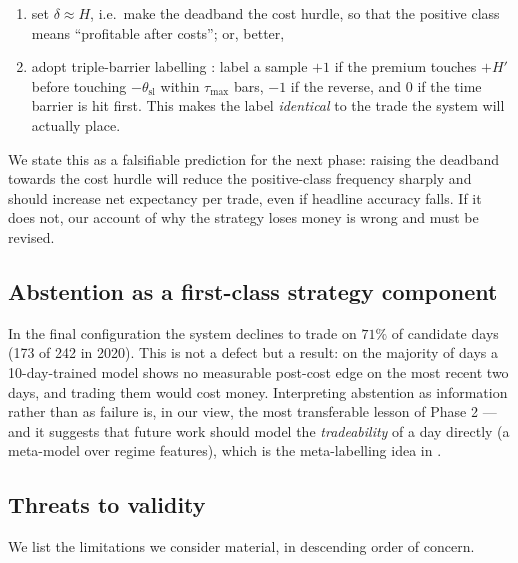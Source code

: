 \documentclass[11pt,a4paper]{article}
\begin{document}
\begin{enumerate}
  \item set $\delta \approx H$, i.e.\ make the deadband the cost hurdle, so that the
        positive class means ``profitable after costs''; or, better,
  \item adopt triple-barrier labelling \cite{lopezdeprado,darufinance}: label a sample
        $+1$ if the premium touches $+H'$ before touching $-\theta_{\text{sl}}$ within
        $\tau_{\max}$ bars, $-1$ if the reverse, and $0$ if the time barrier is hit first.
        This makes the label \emph{identical} to the trade the system will actually place.
\end{enumerate}
We state this as a falsifiable prediction for the next phase: raising the deadband
towards the cost hurdle will reduce the positive-class frequency sharply and should
increase net expectancy per trade, even if headline accuracy falls. If it does not, our
account of why the strategy loses money is wrong and must be revised.

\subsection{Abstention as a first-class strategy component}

In the final configuration the system declines to trade on $71\%$ of candidate days
(173 of 242 in 2020). This is not a defect but a result: on the majority of days a
10-day-trained model shows no measurable post-cost edge on the most recent two days, and
trading them would cost money. Interpreting abstention as information rather than as
failure is, in our view, the most transferable lesson of Phase 2 --- and it suggests that
future work should model the \emph{tradeability} of a day directly (a meta-model over
regime features), which is the meta-labelling idea in \cite{lopezdeprado}.

\subsection{Threats to validity}\label{sec:threats}

We list the limitations we consider material, in descending order of concern.
\end{document}
